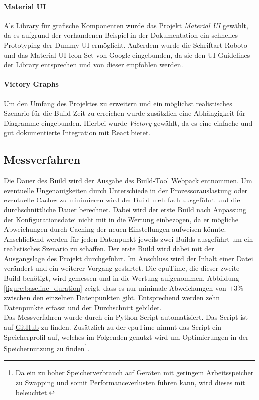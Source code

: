 \documentclass[11pt]{report}
\begin{document}
				\paragraph{Material UI} Als Library für grafische Komponenten wurde das Projekt \emph{Material UI}\cite{frameworks:material-ui} gewählt, da es aufgrund der vorhandenen Beispiel in der Dokumentation ein schnelles Prototyping der Dummy-UI ermöglicht. Außerdem wurde die Schriftart Roboto und das Material-UI Icon-Set von Google eingebunden, da sie den UI Guidelines\cite{guidelines:material-ui} der Library entsprechen und von dieser empfohlen werden.

				\paragraph{Victory Graphs} Um den Umfang des Projektes zu erweitern und ein möglichst realistisches Szenario für die Build-Zeit zu erreichen wurde zusätzlich eine Abhängigkeit für Diagramme eingebunden. Hierbei wurde \emph{Victory}\cite{frameworks:victory} gewählt, da es eine einfache und gut dokumentierte Integration mit React bietet.

			\subsection{Messverfahren}
				Die Dauer des Build wird der Ausgabe des Build-Tool Webpack entnommen. Um eventuelle Ungenauigkeiten durch Unterschiede in der Prozessorauslastung oder eventuelle Caches zu minimieren wird der Build mehrfach ausgeführt und die durchschnittliche Dauer berechnet. Dabei wird der erste Build nach Anpassung der Konfigurationsdatei nicht mit in die Wertung einbezogen, da er mögliche Abweichungen durch Caching der neuen Einstellungen aufweisen könnte. Anschließend werden für jeden Datenpunkt jeweils zwei Builds ausgeführt um ein realistisches Szenario zu schaffen. Der erste Build wird dabei mit der Ausgangslage des Projekt durchgeführt. Im Anschluss wird der Inhalt einer Datei verändert und ein weiterer Vorgang gestartet. Die \Gls{cpuTime}, die dieser zweite Build benötigt, wird gemessen und in die Wertung aufgenommen. Abbildung \ref{figure:baseline_duration} zeigt, dass es nur minimale Abweichungen von $\pm 3\%$ zwischen den einzelnen Datenpunkten gibt. Entsprechend werden zehn Datenpunkte erfasst und der Durchschnitt gebildet.\\
				Das Messverfahren wurde durch ein Python-Script automatisiert. Das Script ist auf \href{https://github.com/TexNAK/WebBundlerOptimization/blob/40c8c00dee7af6970bc82c29e2fc0f3cfd6c12eb/webpack-project/runBuilds.py}{GitHub} zu finden. Zusätzlich zu der \Gls{cpuTime} nimmt das Script ein Speicherprofil auf, welches im Folgenden genutzt wird um Optimierungen in der Speichernutzung zu finden\footnote{Da ein zu hoher Speicherverbrauch auf Geräten mit geringem Arbeitsspeicher zu Swapping und somit Performanceverlusten führen kann, wird dieses mit beleuchtet.}.
\end{document}

